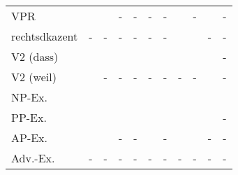 \begin{longtable}{  l  l  l  l  l  l  l  l  l  l  l  }
	VPR & \checkmark & \checkmark & - & - & - & - & \checkmark & - & \checkmark & - \\ 
	\isi{Verbpartikel} rechtsdkazent & - & - & - & - & - & - & \checkmark & \checkmark & - & - \\ 
	V2 (dass) & \checkmark & \checkmark & \checkmark & \checkmark & \checkmark & \checkmark & \checkmark & \checkmark & \checkmark & - \\ 
	V2 (weil) & \checkmark & - & - & - & - & - & - & - & \checkmark & - \\ 
	NP-Ex. & \checkmark & \checkmark & \checkmark & \checkmark & \checkmark & \checkmark & \checkmark & \checkmark & \checkmark & \checkmark \\ 
	PP-Ex. & \checkmark & \checkmark & \checkmark & \checkmark & \checkmark & \checkmark & \checkmark & \checkmark & \checkmark & - \\ 
	AP-Ex. & \checkmark & \checkmark & - & - & \checkmark & - & \checkmark & \checkmark & - & - \\ 
	Adv.-Ex. & - & - & - & - & - & - & - & - & - & - \\ 
\end{longtable}
% 

%  





\newpage
\thispagestyle{empty}
\label{part_schirm}


\label{appendixschirm}

\normalsize